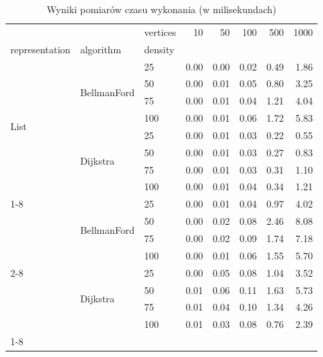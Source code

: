 \begin{table}
\caption{Wyniki pomiarów czasu wykonania (w milisekundach)}
\label{tab:wyniki}
\begin{tabular}{lllrrrrr}
\toprule
 &  & vertices & 10 & 50 & 100 & 500 & 1000 \\
representation & algorithm & density &  &  &  &  &  \\
\midrule
\multirow[t]{8}{*}{List} & \multirow[t]{4}{*}{BellmanFord} & 25 & 0.00 & 0.00 & 0.02 & 0.49 & 1.86 \\
 &  & 50 & 0.00 & 0.01 & 0.05 & 0.80 & 3.25 \\
 &  & 75 & 0.00 & 0.01 & 0.04 & 1.21 & 4.04 \\
 &  & 100 & 0.00 & 0.01 & 0.06 & 1.72 & 5.83 \\
\cline{2-8}
 & \multirow[t]{4}{*}{Dijkstra} & 25 & 0.00 & 0.01 & 0.03 & 0.22 & 0.55 \\
 &  & 50 & 0.00 & 0.01 & 0.03 & 0.27 & 0.83 \\
 &  & 75 & 0.00 & 0.01 & 0.03 & 0.31 & 1.10 \\
 &  & 100 & 0.00 & 0.01 & 0.04 & 0.34 & 1.21 \\
\cline{1-8} \cline{2-8}
\multirow[t]{8}{*}{Matrix} & \multirow[t]{4}{*}{BellmanFord} & 25 & 0.00 & 0.01 & 0.04 & 0.97 & 4.02 \\
 &  & 50 & 0.00 & 0.02 & 0.08 & 2.46 & 8.08 \\
 &  & 75 & 0.00 & 0.02 & 0.09 & 1.74 & 7.18 \\
 &  & 100 & 0.00 & 0.01 & 0.06 & 1.55 & 5.70 \\
\cline{2-8}
 & \multirow[t]{4}{*}{Dijkstra} & 25 & 0.00 & 0.05 & 0.08 & 1.04 & 3.52 \\
 &  & 50 & 0.01 & 0.06 & 0.11 & 1.63 & 5.73 \\
 &  & 75 & 0.01 & 0.04 & 0.10 & 1.34 & 4.26 \\
 &  & 100 & 0.01 & 0.03 & 0.08 & 0.76 & 2.39 \\
\cline{1-8} \cline{2-8}
\bottomrule
\end{tabular}
\end{table}
